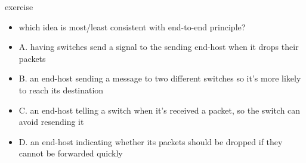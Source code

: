 \begin{frame}{exercise}
\begin{itemize}
    \item which idea is most/least consistent with end-to-end principle?
    \item A. having switches send a signal to the sending end-host when it drops their packets
    \item B. an end-host sending a message to two different switches so it's more likely to reach its destination
    \item C. an end-host telling a switch when it's received a packet, so the switch can avoid resending it
    \item D. an end-host indicating whether its packets should be dropped if they cannot be forwarded quickly
\end{itemize}
\end{frame}
